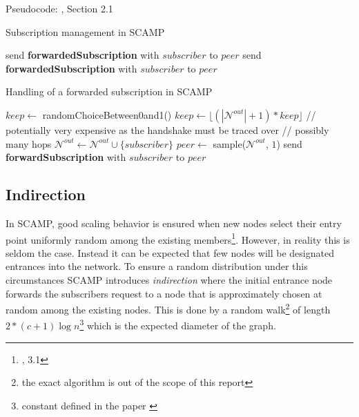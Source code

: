 \documentclass[11pt, english, screen]{report-rd-info}
\begin{document}
Pseudocode: \cite{Ganesh:2001:SPL:648089.747488}, Section 2.1
\begin{algorithm*}[!htbp]
    \caption{Subscription management in SCAMP}
    \begin{algorithmic}[1]
        \State send \textbf{forwardedSubscription} with $subscriber$ to $peer$
        \EndFor
        \State send \textbf{forwardedSubscription} with $subscriber$ to $peer$
        \EndFor
        \EndProcedure
    \end{algorithmic}
    \label{alg:scamp1}
\end{algorithm*}

\begin{algorithm*}[!htbp]
    \caption{Handling of a forwarded subscription in SCAMP}
    \begin{algorithmic}[1]
        \State $keep \gets$ randomChoiceBetween0and1()
        \State $keep \gets \lfloor (|\mathcal{N}^{out}| + 1) * keep \rfloor$
        \State 
        \State // potentially very expensive as the handshake must be traced over
        \State // possibly many hops
        \State $\mathcal{N}^{out} \gets \mathcal{N}^{out} \cup \{subscriber\}$
        \State
        \Else
        \State $peer \gets$ sample($\mathcal{N}^{out}$, $1$)
        \State send \textbf{forwardSubscription} with $subscriber$ to $peer$
        \EndIf
        \EndProcedure
    \end{algorithmic}
    \label{alg:scamp2}
\end{algorithm*}

\subsection{Indirection}

In SCAMP, good scaling behavior is ensured when new nodes select their entry point uniformly random among the existing members\footnote{\cite{Ganesh:2001:SPL:648089.747488}, 3.1}.
However, in reality this is seldom the case. Instead it can be expected that few nodes will be designated entrances into the network.
To ensure a random distribution under this circumstances SCAMP introduces \emph{indirection} where the initial entrance node forwards the subscribers request to a node that is approximately chosen at random among the existing nodes.
This is done by a random walk\footnote{the exact algorithm is out of the scope of this report} of length $2*(c+1)\log{n}$\footnote{constant defined in the paper \cite{Ganesh:2001:SPL:648089.747488}} which is the expected diameter of the graph.
\end{document}

